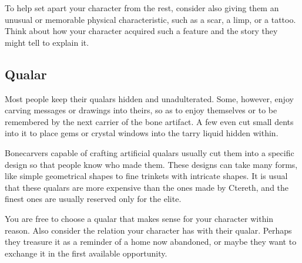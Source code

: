     To help set apart your character from the rest, consider also giving them an unusual or memorable physical characteristic, such as a scar, a limp, or a tattoo.
    Think about how your character acquired such a feature and the story they might tell to explain it.

\subsection*{Qualar}
    Most people keep their qualars hidden and unadulterated.
    Some, however, enjoy carving messages or drawings into theirs, so as to enjoy themselves or to be remembered by the next carrier of the bone artifact.
    A few even cut small dents into it to place gems or crystal windows into the tarry liquid hidden within.

    Bonecarvers capable of crafting artificial qualars usually cut them into a specific design so that people know who made them.
    These designs can take many forms, like simple geometrical shapes to fine trinkets with intricate shapes.
    It is usual that these qualars are more expensive than the ones made by Ctereth, and the finest ones are usually reserved only for the elite.

    You are free to choose a qualar that makes sense for your character within reason.
    Also consider the relation your character has with their qualar.
    Perhaps they treasure it as a reminder of a home now abandoned, or maybe they want to exchange it in the first available opportunity.

\pagebreak


\vspace{6.5cm}

